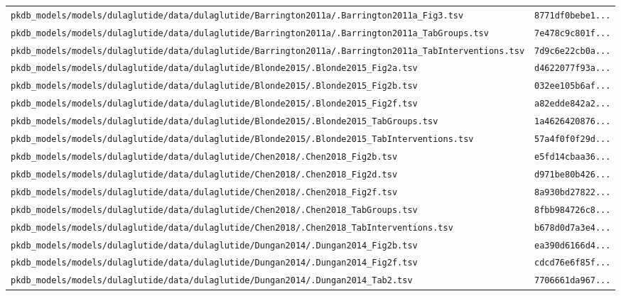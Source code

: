 \begin{longtable}{ll}
\texttt{pkdb\_models/models/dulaglutide/data/dulaglutide/Barrington2011a/.Barrington2011a\_Fig3.tsv} & \texttt{8771df0bebe1...} \\
\texttt{pkdb\_models/models/dulaglutide/data/dulaglutide/Barrington2011a/.Barrington2011a\_TabGroups.tsv} & \texttt{7e478c9c801f...} \\
\texttt{pkdb\_models/models/dulaglutide/data/dulaglutide/Barrington2011a/.Barrington2011a\_TabInterventions.tsv} & \texttt{7d9c6e22cb0a...} \\
\texttt{pkdb\_models/models/dulaglutide/data/dulaglutide/Blonde2015/.Blonde2015\_Fig2a.tsv} & \texttt{d4622077f93a...} \\
\texttt{pkdb\_models/models/dulaglutide/data/dulaglutide/Blonde2015/.Blonde2015\_Fig2b.tsv} & \texttt{032ee105b6af...} \\
\texttt{pkdb\_models/models/dulaglutide/data/dulaglutide/Blonde2015/.Blonde2015\_Fig2f.tsv} & \texttt{a82edde842a2...} \\
\texttt{pkdb\_models/models/dulaglutide/data/dulaglutide/Blonde2015/.Blonde2015\_TabGroups.tsv} & \texttt{1a4626420876...} \\
\texttt{pkdb\_models/models/dulaglutide/data/dulaglutide/Blonde2015/.Blonde2015\_TabInterventions.tsv} & \texttt{57a4f0f0f29d...} \\
\texttt{pkdb\_models/models/dulaglutide/data/dulaglutide/Chen2018/.Chen2018\_Fig2b.tsv} & \texttt{e5fd14cbaa36...} \\
\texttt{pkdb\_models/models/dulaglutide/data/dulaglutide/Chen2018/.Chen2018\_Fig2d.tsv} & \texttt{d971be80b426...} \\
\texttt{pkdb\_models/models/dulaglutide/data/dulaglutide/Chen2018/.Chen2018\_Fig2f.tsv} & \texttt{8a930bd27822...} \\
\texttt{pkdb\_models/models/dulaglutide/data/dulaglutide/Chen2018/.Chen2018\_TabGroups.tsv} & \texttt{8fbb984726c8...} \\
\texttt{pkdb\_models/models/dulaglutide/data/dulaglutide/Chen2018/.Chen2018\_TabInterventions.tsv} & \texttt{b678d0d7a3e4...} \\
\texttt{pkdb\_models/models/dulaglutide/data/dulaglutide/Dungan2014/.Dungan2014\_Fig2b.tsv} & \texttt{ea390d6166d4...} \\
\texttt{pkdb\_models/models/dulaglutide/data/dulaglutide/Dungan2014/.Dungan2014\_Fig2f.tsv} & \texttt{cdcd76e6f85f...} \\
\texttt{pkdb\_models/models/dulaglutide/data/dulaglutide/Dungan2014/.Dungan2014\_Tab2.tsv} & \texttt{7706661da967...} \\

\end{longtable}
